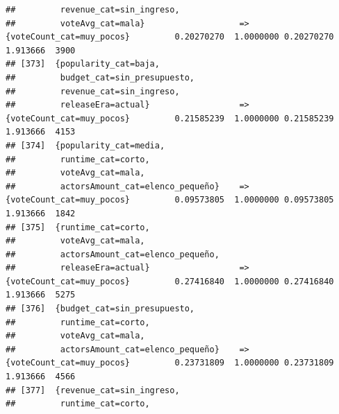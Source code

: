 \documentclass[
]{article}
\begin{document}
\begin{verbatim}
##         revenue_cat=sin_ingreso,                                                                                                
##         voteAvg_cat=mala}                   => {voteCount_cat=muy_pocos}         0.20270270  1.0000000 0.20270270 1.913666  3900
## [373]  {popularity_cat=baja,                                                                                                    
##         budget_cat=sin_presupuesto,                                                                                             
##         revenue_cat=sin_ingreso,                                                                                                
##         releaseEra=actual}                  => {voteCount_cat=muy_pocos}         0.21585239  1.0000000 0.21585239 1.913666  4153
## [374]  {popularity_cat=media,                                                                                                   
##         runtime_cat=corto,                                                                                                      
##         voteAvg_cat=mala,                                                                                                       
##         actorsAmount_cat=elenco_pequeño}    => {voteCount_cat=muy_pocos}         0.09573805  1.0000000 0.09573805 1.913666  1842
## [375]  {runtime_cat=corto,                                                                                                      
##         voteAvg_cat=mala,                                                                                                       
##         actorsAmount_cat=elenco_pequeño,                                                                                        
##         releaseEra=actual}                  => {voteCount_cat=muy_pocos}         0.27416840  1.0000000 0.27416840 1.913666  5275
## [376]  {budget_cat=sin_presupuesto,                                                                                             
##         runtime_cat=corto,                                                                                                      
##         voteAvg_cat=mala,                                                                                                       
##         actorsAmount_cat=elenco_pequeño}    => {voteCount_cat=muy_pocos}         0.23731809  1.0000000 0.23731809 1.913666  4566
## [377]  {revenue_cat=sin_ingreso,                                                                                                
##         runtime_cat=corto,                                                                                                      

\end{verbatim}
\end{document}
